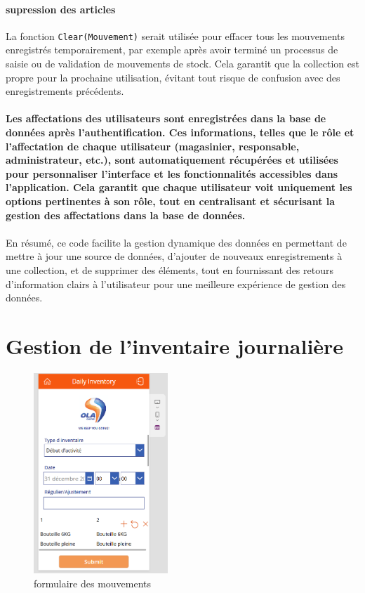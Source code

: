 \documentclass[a4paper, oneside, 12pt, final]{extreport}
\begin{document}
\paragraph{supression des articles}La fonction \texttt{Clear(Mouvement)} serait utilisée pour effacer tous les mouvements enregistrés temporairement, par exemple après avoir terminé un processus de saisie ou de validation de mouvements de stock. Cela garantit que la collection est propre pour la prochaine utilisation, évitant tout risque de confusion avec des enregistrements précédents.
\\
\\
\textbf{Les affectations des utilisateurs sont enregistrées dans la base de données après l'authentification. Ces informations, telles que le rôle et l'affectation de chaque utilisateur (magasinier, responsable, administrateur, etc.), sont automatiquement récupérées et utilisées pour personnaliser l'interface et les fonctionnalités accessibles dans l'application. Cela garantit que chaque utilisateur voit uniquement les options pertinentes à son rôle, tout en centralisant et sécurisant la gestion des affectations dans la base de données.}
\\
\\
En résumé, ce code facilite la gestion dynamique des données en permettant de mettre à jour une source de données, d'ajouter de nouveaux enregistrements à une collection, et de supprimer des éléments, tout en fournissant des retours d'information clairs à l'utilisateur pour une meilleure expérience de gestion des données.


\newpage
\section{Gestion de l'inventaire journalière}
\begin{figure}[h]
    \centering
    \includegraphics[width=0.45\textwidth]{di.png} %
    \caption{formulaire des mouvements}
    \label{fig:formulaire des mouvements}
\end{figure}
\end{document}
